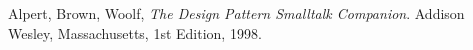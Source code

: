 \begin{thebibliography}{99}

  Alpert, Brown, Woolf,
  \emph{The Design Pattern Smalltalk Companion}.
  Addison Wesley, Massachusetts,
  1st Edition,
  1998.

\end{thebibliography}